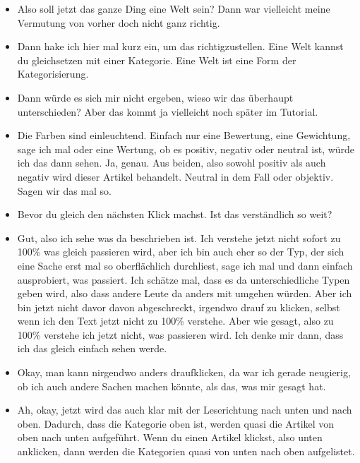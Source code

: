 {\begin{itemize}[]
    Also dieser lila Teil könnte jetzt eine Welt und einer Kategorie zugeordnet sein, so wie ich es jetzt verstanden habe.
    \item {} Also soll jetzt das ganze Ding eine Welt sein?
    Dann war vielleicht meine Vermutung von vorher doch nicht ganz richtig.
    \item {} Dann hake ich hier mal kurz ein, um das richtigzustellen.
    Eine Welt kannst du gleichsetzen mit einer Kategorie.
    Eine Welt ist eine Form der Kategorisierung.
    \item {} Dann würde es sich mir nicht ergeben, wieso wir das überhaupt unterschieden? 
    Aber das kommt ja vielleicht noch später im Tutorial.
    \item {} Die Farben sind einleuchtend. 
    Einfach nur eine Bewertung, eine Gewichtung, sage ich mal oder eine Wertung, ob es positiv, negativ oder neutral ist, würde ich das dann sehen.
    Ja, genau.
    Aus beiden, also sowohl positiv als auch negativ wird dieser Artikel behandelt. 
    Neutral in dem Fall oder objektiv.
    Sagen wir das mal so.
    \item {} Bevor du gleich den nächsten Klick machst.
    Ist das verständlich so weit?
    \item {} Gut, also ich sehe was da beschrieben ist.
    Ich verstehe jetzt nicht sofort zu 100\% was gleich passieren wird, aber ich bin auch eher so der Typ, der sich eine Sache erst mal so oberflächlich durchliest, sage ich mal und dann einfach ausprobiert, was passiert.
    Ich schätze mal, dass es da unterschiedliche Typen geben wird, also dass andere Leute da anders mit umgehen würden.
    Aber ich bin jetzt nicht davor davon abgeschreckt, irgendwo drauf zu klicken, selbst wenn ich den Text jetzt nicht zu 100\% verstehe.
    Aber wie gesagt, also zu 100\% verstehe ich jetzt nicht, was passieren wird.
    Ich denke mir dann, dass ich das gleich einfach sehen werde.
    \item {} Okay, man kann nirgendwo anders draufklicken, da war ich gerade neugierig, ob ich auch andere Sachen machen könnte, als das, was mir gesagt hat.
    \item {} Ah, okay, jetzt wird das auch klar mit der Leserichtung nach unten und nach oben.
    Dadurch, dass die Kategorie oben ist, werden quasi die Artikel von oben nach unten aufgeführt.
    Wenn du einen Artikel klickst, also unten anklicken, dann werden die Kategorien quasi von unten nach oben aufgelistet.

\end{itemize}}
